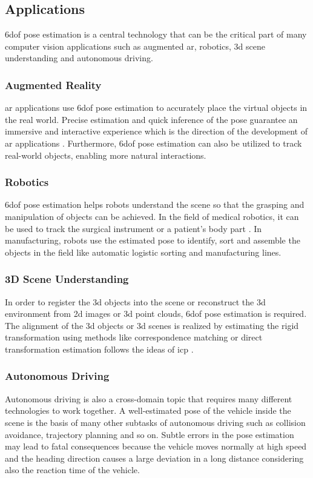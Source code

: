\documentclass[12pt,DIV14,BCOR12mm,a4paper,footinclude=false,headinclude,parskip=half-,twoside,openright,cleardoublepage=empty,toc=index,bibliography=totoc,listof=totoc]{scrreprt}
\numberwithin{equation}{chapter}
\begin{document}
\subsection{Applications}
\gls{6dof} pose estimation is a central technology that can be the critical part of many computer vision applications such as augmented \gls{ar}, robotics, \gls{3d} scene understanding and autonomous driving.

\subsubsection{Augmented Reality}
\gls{ar} applications use \gls{6dof} pose estimation to accurately place the virtual objects in the real world. Precise estimation and quick inference of the pose guarantee an immersive and interactive experience 
which is the direction of the development of \gls{ar} applications \cite{9836663}. Furthermore, \gls{6dof} pose estimation can also be utilized to track real-world objects, enabling more natural interactions.

\subsubsection{Robotics}
\gls{6dof} pose estimation helps robots understand the scene so that the grasping and manipulation of objects can be achieved. In the field of medical robotics, it can be used to track the surgical instrument or a patient's body part \cite{cao20236impose}. In manufacturing, robots use the estimated pose to identify, sort and assemble the objects in the field like automatic logistic sorting and manufacturing lines.

\subsubsection{3D Scene Understanding}
In order to register the \gls{3d} objects into the scene or reconstruct the \gls{3d} environment from \gls{2d} images or \gls{3d} point clouds, \gls{6dof} pose estimation is required. The alignment of the \gls{3d} objects or \gls{3d} scenes is realized by estimating the rigid transformation using methods like correspondence matching \cite{qin2022geometric} or direct transformation estimation \cite{fu2021robust} follows the ideas of \gls{icp} \cite{Besl1992AMF}.

\subsubsection{Autonomous Driving}
Autonomous driving is also a cross-domain topic that requires many different technologies to work together. A well-estimated pose of the vehicle inside the scene is the basis of many other subtasks of autonomous driving such as collision avoidance, trajectory planning and so on. Subtle errors in the pose estimation may lead to fatal consequences \cite{auto} because the vehicle moves normally at high speed and the heading direction causes a large deviation in a long distance considering also the reaction time of the vehicle.
\end{document}
